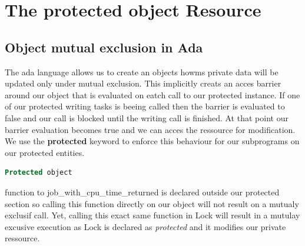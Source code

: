 \documentclass[10pt,a4paper]{article}
\begin{document}
\tableofcontents

\thispagestyle{empty}


\newpage
\section{The protected object Resource}
\subsection{Object mutual exclusion in Ada}
The ada language allows us to create an objects howms private data will be updated only under mutual exclusion. This implicitly creats an acces barrier around our object that is evaluated on eatch call to our protected instance. If one of our protected writing tasks is beeing called then the barrier is evaluated to false and our call is blocked until the writing call is finished. At that point our barrier evaluation becomes true and we can acces the ressource for modification.
\\We use the \textbf{protected} keyword to enforce this behaviour for our subprograms on our protected entities.
\begin{lstlisting}[language=ada,caption={chrt man page}]
Protected object
\end{lstlisting}
function to job\_with\_cpu\_time\_returned is declared outside our protected section so calling this function directly on our object will not result on a mutualy exclusif call.
Yet, calling this exact same function in Lock will result in a mutulay excusive execution as Lock is declared as \textit{protected} and it modifies our private ressource.
\end{document}
